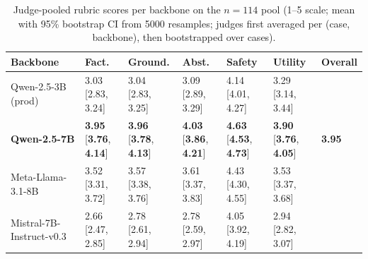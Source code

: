 \documentclass[11pt]{article}
\begin{document}
\begin{table}[!htbp]
\centering
\caption{Judge-pooled rubric scores per backbone on the $n=114$ pool (1--5 scale; mean with 95\% bootstrap CI from 5000 resamples; judges first averaged per (case, backbone), then bootstrapped over cases).}
\label{tab:rubric_n114}
\scriptsize
\setlength{\tabcolsep}{3pt}
\renewcommand{\arraystretch}{1.15}
\begin{tabularx}{\linewidth}{l *{6}{>{\centering\arraybackslash}X}}
\toprule
Backbone & Fact. & Ground. & Abst. & Safety & Utility & Overall \\
\midrule
Qwen-2.5-3B (prod)
& \makecell[c]{3.03\\{}[2.83, 3.24]}
& \makecell[c]{3.04\\{}[2.83, 3.25]}
& \makecell[c]{3.09\\{}[2.89, 3.29]}
& \makecell[c]{4.14\\{}[4.01, 4.27]}
& \makecell[c]{3.29\\{}[3.14, 3.44]}
& 3.30 \\

\textbf{Qwen-2.5-7B}
& \makecell[c]{\textbf{3.95}\\{}[\textbf{3.76}, \textbf{4.14}]}
& \makecell[c]{\textbf{3.96}\\{}[\textbf{3.78}, \textbf{4.13}]}
& \makecell[c]{\textbf{4.03}\\{}[\textbf{3.86}, \textbf{4.21}]}
& \makecell[c]{\textbf{4.63}\\{}[\textbf{4.53}, \textbf{4.73}]}
& \makecell[c]{\textbf{3.90}\\{}[\textbf{3.76}, \textbf{4.05}]}
& \textbf{3.95} \\

Meta-Llama-3.1-8B
& \makecell[c]{3.52\\{}[3.31, 3.72]}
& \makecell[c]{3.57\\{}[3.38, 3.76]}
& \makecell[c]{3.61\\{}[3.37, 3.83]}
& \makecell[c]{4.43\\{}[4.30, 4.55]}
& \makecell[c]{3.53\\{}[3.37, 3.68]}
& 3.73 \\

Mistral-7B-Instruct-v0.3
& \makecell[c]{2.66\\{}[2.47, 2.85]}
& \makecell[c]{2.78\\{}[2.61, 2.94]}
& \makecell[c]{2.78\\{}[2.59, 2.97]}
& \makecell[c]{4.05\\{}[3.92, 4.19]}
& \makecell[c]{2.94\\{}[2.82, 3.07]}
& 3.04 \\
\bottomrule
\end{tabularx}
\end{table}
\end{document}

